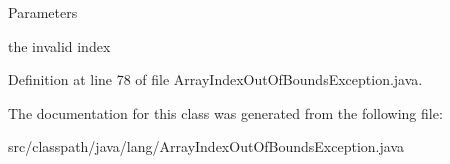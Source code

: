 \begin{DoxyParams}{Parameters}
\item[{\em index}]the invalid index \end{DoxyParams}


Definition at line 78 of file ArrayIndexOutOfBoundsException.java.



The documentation for this class was generated from the following file:\begin{DoxyCompactItemize}
\item 
src/classpath/java/lang/ArrayIndexOutOfBoundsException.java\end{DoxyCompactItemize}

